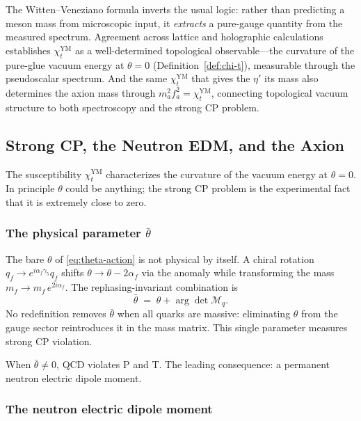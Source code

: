\medskip

\noindent The Witten--Veneziano formula inverts the usual logic: rather than predicting a meson mass from microscopic input, it \emph{extracts} a pure-gauge quantity from the measured spectrum.  Agreement across lattice \cite{CichyLatticeWittenVeneziano} and holographic \cite{AreanU1AHolographicQCD} calculations establishes $\chi_t^{\mathrm{YM}}$ as a well-determined topological observable---the curvature of the pure-glue vacuum energy at $\theta=0$ (Definition~\ref{def:chi-t}), measurable through the pseudoscalar spectrum.  And the same $\chi_t^{\mathrm{YM}}$ that gives the $\eta'$ its mass also determines the axion mass through $m_a^2 f_a^2 = \chi_t^{\mathrm{YM}}$, connecting topological vacuum structure to both spectroscopy and the strong CP problem.

\subsection{Strong CP, the Neutron EDM, and the Axion}
\label{subsec:strong-cp-axion}

The susceptibility $\chi_t^{\mathrm{YM}}$ characterizes the curvature of the vacuum energy at $\theta=0$.  In principle $\theta$ could be anything; the strong CP problem is the experimental fact that it is extremely close to zero.

\subsubsection{The physical parameter $\bar\theta$}

The bare $\theta$ of \eqref{eq:theta-action} is not physical by itself.  A chiral rotation $q_f\to e^{i\alpha_f\gamma_5}q_f$ shifts $\theta\to\theta - 2\alpha_f$ via the anomaly while transforming the mass $m_f\to m_f\,e^{2i\alpha_f}$.  The rephasing-invariant combination is \cite{Dine2000TASIStrongCP}
\begin{equation}\label{eq:bar-theta-def}
  \bar\theta \;=\; \theta + \arg\det \mathcal{M}_q.
\end{equation}
No redefinition removes $\bar\theta$ when all quarks are massive: eliminating $\theta$ from the gauge sector reintroduces it in the mass matrix.  This single parameter measures strong CP violation.

When $\bar\theta\neq 0$, QCD violates P and T.  The leading consequence: a permanent neutron electric dipole moment.

\subsubsection{The neutron electric dipole moment}

